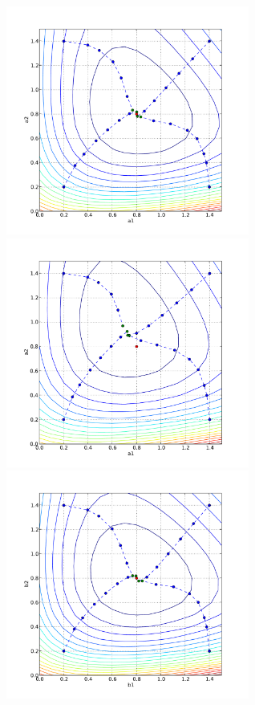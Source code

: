\begin{figure}
  \begin{center}
    \includegraphics[width=8cm]{chapters/schroll/pdf/a1a2scan4.pdf}
    \includegraphics[width=8cm]{chapters/schroll/pdf/a1a2scan4-5.pdf}
    \includegraphics[width=8cm]{chapters/schroll/pdf/b1b2scan4.pdf}

\end{center}
\end{figure}

